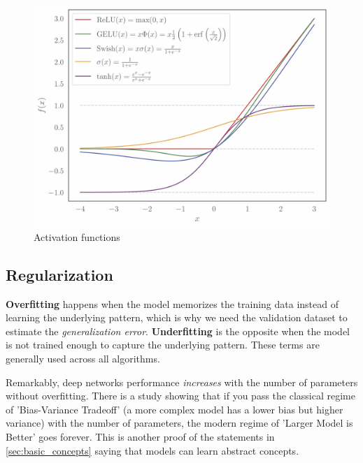 \begin{figure}[htb]
    \centering
    \includegraphics[width=1\linewidth]{src/img/activation_functions_a.jpg}
    \caption{Activation functions}
    \label{fig:activations}
\end{figure}

\subsection{Regularization}
\label{sec:regularization}
\textbf{Overfitting} happens when the model memorizes the training data instead of learning the underlying pattern, which is why we need the validation dataset to estimate the \emph{generalization error}.
\textbf{Underfitting} is the opposite when the model is not trained enough to capture the underlying pattern.
These terms are generally used across all \ml algorithms. 

Remarkably, deep networks performance \emph{increases} with the number of parameters without overfitting.
There is a study \cite{double_descent} showing that if you pass the classical regime of 'Bias-Variance Tradeoff' (a more complex model has a lower bias but higher variance) with the number of parameters, the modern regime of 'Larger Model is Better' goes forever.
This is another proof of the statements in \cref{sec:basic_concepts} saying that \dl models can learn abstract concepts. 

